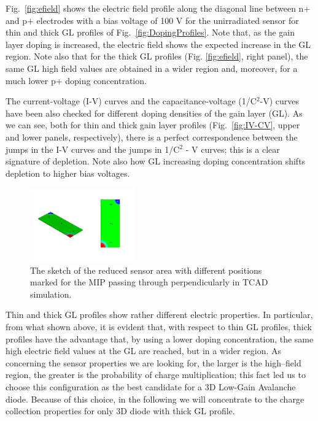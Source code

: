 \documentclass[aps,pt14,superscriptaddress,floatfix,nofootinbib]{revtex4}
\begin{document}
Fig.~\ref{fig:efield} shows the electric field profile along the diagonal line between n+ and p+ electrodes with a bias voltage of 100 V for the unirradiated sensor for thin and thick GL profiles of Fig.~\ref{fig:DopingProfiles}. Note that, as the gain layer doping is increased, the electric field shows the expected increase in the GL region. Note also that for the thick GL profiles (Fig. \ref{fig:efield}, right panel), the same GL high field values are obtained in a wider region and, moreover, for a much lower p+ doping concentration. 



The current-voltage (I-V) curves and the capacitance-voltage (1/C$^2$-V) curves have been also checked for 
different doping densities of the gain layer (GL). As we can see, both for thin and thick gain layer profiles (Fig.~\ref{fig:IV-CV}, upper and lower panels, respectively), there is a perfect correspondence between the jumps in the I-V curves and the jumps in 1/C$^2$ - V curves; this is a clear signature of depletion. Note also how GL increasing doping concentration shifts depletion to higher bias voltages.   

\begin{figure}[hbtp]
\begin{center}
\includegraphics[width=0.4\textwidth,keepaspectratio]{figures1/Slice.pdf}
\caption{The sketch of the reduced sensor area with different positions marked for the MIP passing through perpendicularly in TCAD simulation.\label{fig:box_points}}
\end{center}
\end{figure}

Thin and thick GL profiles show rather different electric properties. In particular, from what shown above, it is evident that, with respect to thin GL profiles, thick profiles have the advantage that, by using a lower doping concentration, the same high electric field values at the GL are reached, but in a wider region. As concerning the sensor properties we are looking for, the larger is the high--field region, the greater is the probability of charge multiplication; this fact led us to choose this configuration as the best candidate for a 3D Low-Gain Avalanche diode. Because of this choice, in the following we will concentrate to the charge collection properties for only 3D diode with thick GL profile.
\end{document}
